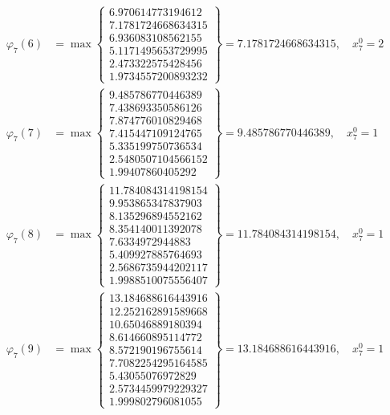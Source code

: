 \documentclass{article}
\begin{document}
\begin{align*}
  
\varphi_{7}(6) &= \max \left\{ \begin{array}{c}
6.970614773194612 \\
 7.1781724668634315 \\
 6.936083108562155 \\
 5.1171495653729995 \\
 2.473322575428456 \\
 1.9734557200893232
\end{array} \right\} = 7.1781724668634315, \quad x_{7}^0 = 2\\
  
  
  
  
\varphi_{7}(7) &= \max \left\{ \begin{array}{c}
9.485786770446389 \\
 7.438693350586126 \\
 7.874776010829468 \\
 7.415447109124765 \\
 5.335199750736534 \\
 2.5480507104566152 \\
 1.99407860405292
\end{array} \right\} = 9.485786770446389, \quad x_{7}^0 = 1\\
  
  
  
  
\varphi_{7}(8) &= \max \left\{ \begin{array}{c}
11.784084314198154 \\
 9.953865347837903 \\
 8.135296894552162 \\
 8.354140011392078 \\
 7.6334972944883 \\
 5.409927885764693 \\
 2.5686735944202117 \\
 1.9988510075556407
\end{array} \right\} = 11.784084314198154, \quad x_{7}^0 = 1\\
  
  
  
  
\varphi_{7}(9) &= \max \left\{ \begin{array}{c}
13.184688616443916 \\
 12.252162891589668 \\
 10.65046889180394 \\
 8.614660895114772 \\
 8.572190196755614 \\
 7.7082254295164585 \\
 5.43055076972829 \\
 2.5734459979229327 \\
 1.999802796081055
\end{array} \right\} = 13.184688616443916, \quad x_{7}^0 = 1\\
  

\end{align*}
\end{document}
